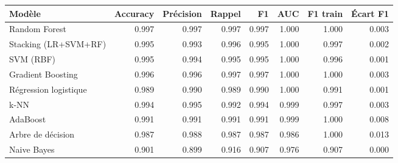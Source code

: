 \begin{tabular}{lrrrrrrr}
\toprule
Modèle & Accuracy & Précision & Rappel & F1 & AUC & F1 train & Écart F1 \\
\midrule
Random Forest & 0.997 & 0.997 & 0.997 & 0.997 & 1.000 & 1.000 & 0.003 \\
Stacking (LR+SVM+RF) & 0.995 & 0.993 & 0.996 & 0.995 & 1.000 & 0.997 & 0.002 \\
SVM (RBF) & 0.995 & 0.994 & 0.995 & 0.995 & 1.000 & 0.996 & 0.001 \\
Gradient Boosting & 0.996 & 0.996 & 0.997 & 0.997 & 1.000 & 1.000 & 0.003 \\
Régression logistique & 0.989 & 0.990 & 0.989 & 0.990 & 1.000 & 0.991 & 0.001 \\
k-NN & 0.994 & 0.995 & 0.992 & 0.994 & 0.999 & 0.997 & 0.003 \\
AdaBoost & 0.991 & 0.991 & 0.991 & 0.991 & 0.999 & 1.000 & 0.008 \\
Arbre de décision & 0.987 & 0.988 & 0.987 & 0.987 & 0.986 & 1.000 & 0.013 \\
Naive Bayes & 0.901 & 0.899 & 0.916 & 0.907 & 0.976 & 0.907 & 0.000 \\
\bottomrule
\end{tabular}